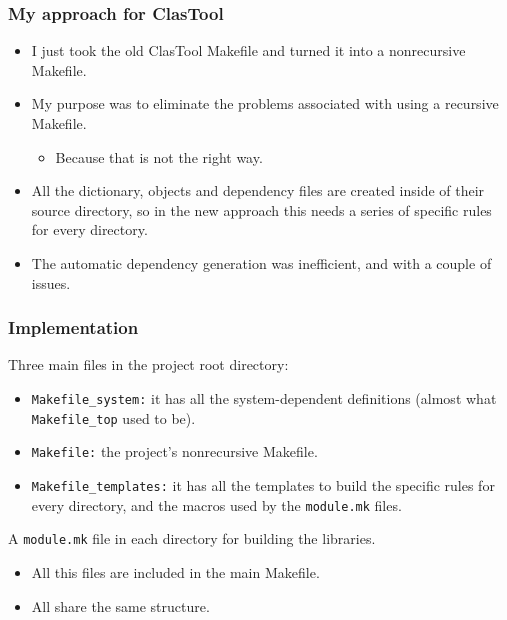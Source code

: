 \documentclass[11pt]{beamer}
\begin{document}

\begin{frame}
  \frametitle{My approach for ClasTool}
  \begin{itemize}[<+->]
    \item I just took the old ClasTool Makefile and turned it into a
      nonrecursive Makefile.\\[4mm]
    \item My purpose was to eliminate the problems associated with using a
      recursive Makefile. 

      \begin{itemize}
        \item Because that is not the right way.\\[4mm]
      \end{itemize}

    \item All the dictionary, objects and dependency files are created inside
      of their source directory, so in the new approach this needs a series of
      specific rules for every directory.\\[4mm]
    \item The automatic dependency generation was inefficient, and with a
      couple of issues. 
  \end{itemize}
\end{frame}


\begin{frame}
  \frametitle{Implementation}
  Three main files in the project root directory:

  \begin{itemize}
    \item \texttt{Makefile\_system:} it has all the system-dependent
      definitions (almost what \texttt{Makefile\_top} used to be).\\[2mm]
    \item \texttt{Makefile:} the project's nonrecursive Makefile.\\[2mm]
    \item \texttt{Makefile\_templates:} it has all the templates to build the
      specific rules for every directory, and the macros used by the
      \texttt{module.mk} files. 
  \end{itemize}

  \vspace{3mm}
  A \texttt{module.mk} file in each directory for building the libraries.

  \begin{itemize}
    \item All this files are included in the main Makefile.\\[2mm]
    \item All share the same structure.
  \end{itemize}
\end{frame}
\end{document}
